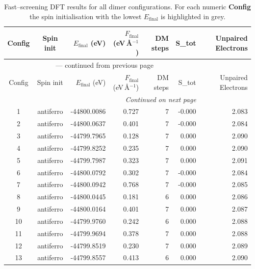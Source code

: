 
\begin{longtable}{@{}ccrrrrr@{}}
\caption{Fast–screening DFT results for all dimer configurations.
         For each numeric \textbf{Config} the spin initialisation with the
         lowest $E_{\mathrm{final}}$ is highlighted in grey.}\label{tab:dimer_full}\\
\toprule
Config & Spin init & $E_{\mathrm{final}}$ (eV) &
$F_{\mathrm{final}}$ (eV\,\AA$^{-1}$) & DM steps & S_{tot} & Unpaired Electrons\\
\midrule
\endfirsthead
\multicolumn{6}{c}{{\tablename}~\thetable{} — continued from previous page}\\
\toprule
Config & Spin init & $E_{\mathrm{final}}$ (eV) &
$F_{\mathrm{final}}$ (eV\,\AA$^{-1}$) & DM steps & S_{tot} & Unpaired Electrons\\
\midrule
\endhead
\midrule
\multicolumn{6}{r}{\emph{Continued on next page}}\\
\endfoot
\bottomrule
\endlastfoot
\rowcolor{gray!20} 1 & antiferro & -44800.0086 & 0.727 & 7 & -0.000 & 2.083 \\
\rowcolor{gray!20} 2 & antiferro & -44800.0637 & 0.401 & 7 & -0.000 & 2.084 \\
\rowcolor{gray!20} 3 & antiferro & -44799.7965 & 0.128 & 7 & 0.000 & 2.090 \\
\rowcolor{gray!20} 4 & antiferro & -44799.8252 & 0.235 & 7 & 0.000 & 2.090 \\
\rowcolor{gray!20} 5 & antiferro & -44799.7987 & 0.323 & 7 & 0.000 & 2.091 \\
\rowcolor{gray!20} 6 & antiferro & -44800.0792 & 0.302 & 7 & -0.000 & 2.084 \\
\rowcolor{gray!20} 7 & antiferro & -44800.0942 & 0.768 & 7 & -0.000 & 2.085 \\
\rowcolor{gray!20} 8 & antiferro & -44800.0445 & 0.181 & 6 & 0.000 & 2.086 \\
\rowcolor{gray!20} 9 & antiferro & -44800.0164 & 0.401 & 7 & 0.000 & 2.087 \\
\rowcolor{gray!20} 10 & antiferro & -44799.9760 & 0.242 & 6 & 0.000 & 2.088 \\
\rowcolor{gray!20} 11 & antiferro & -44799.9694 & 0.378 & 7 & 0.000 & 2.088 \\
\rowcolor{gray!20} 12 & antiferro & -44799.8519 & 0.230 & 7 & 0.000 & 2.089 \\
\rowcolor{gray!20} 13 & antiferro & -44799.8557 & 0.413 & 6 & 0.000 & 2.090 \\
\end{longtable}